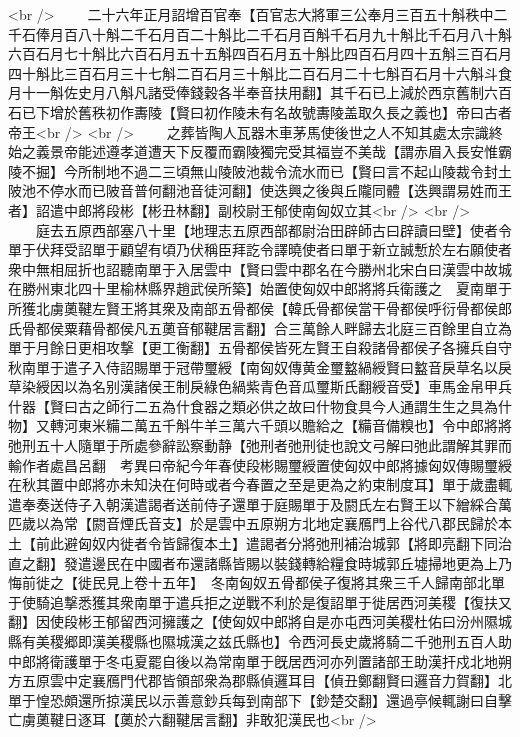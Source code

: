 <br />
　　二十六年正月詔增百官奉【百官志大將軍三公奉月三百五十斛秩中二千石俸月百八十斛二千石月百二十斛比二千石月百斛千石月九十斛比千石月八十斛六百石月七十斛比六百石月五十五斛四百石月五十斛比四百石月四十五斛三百石月四十斛比三百石月三十七斛二百石月三十斛比二百石月二十七斛百石月十六斛斗食月十一斛佐史月八斛凡諸受俸錢穀各半奉音扶用翻】其千石已上減於西京舊制六百石已下增於舊秩初作夀陵【賢曰初作陵未有名故號夀陵盖取久長之義也】帝曰古者帝王<br />
<br />
　　之葬皆陶人瓦器木車茅馬使後世之人不知其處太宗識終始之義景帝能述遵孝道遭天下反覆而霸陵獨完受其福豈不美哉【謂赤眉入長安惟霸陵不掘】今所制地不過二三頃無山陵陂池裁令流水而已【賢曰言不起山陵裁令封土陂池不停水而已陂音普何翻池音徒河翻】使迭興之後與丘隴同體【迭興謂易姓而王者】詔遣中郎將段彬【彬丑林翻】副校尉王郁使南匈奴立其<br />
<br />
　　庭去五原西部塞八十里【地理志五原西部都尉治田辟師古曰辟讀曰壁】使者令單于伏拜受詔單于顧望有頃乃伏稱臣拜訖令譯曉使者曰單于新立誠慙於左右願使者衆中無相屈折也詔聽南單于入居雲中【賢曰雲中郡名在今勝州北宋白曰漢雲中故城在勝州東北四十里榆林縣界趙武侯所築】始置使匈奴中郎將將兵衛護之　夏南單于所獲北虜薁鞬左賢王將其衆及南部五骨都侯【韓氏骨都侯當干骨都侯呼衍骨都侯郎氏骨都侯粟藉骨都侯凡五薁音郁鞬居言翻】合三萬餘人畔歸去北庭三百餘里自立為單于月餘日更相攻撃【更工衡翻】五骨都侯皆死左賢王自殺諸骨都侯子各擁兵自守　秋南單于遣子入侍詔賜單于冠帶璽綬【南匈奴傳黄金璽盭緺綬賢曰盭音戾草名以戾草染綬因以為名别漢諸侯王制戾綠色緺紫青色音瓜璽斯氏翻綬音受】車馬金帛甲兵什器【賢曰古之師行二五為什食器之類必供之故曰什物食具今人通謂生生之具為什物】又轉河東米糒二萬五千斛牛羊三萬六千頭以贍給之【糒音備糗也】令中郎將將弛刑五十人隨單于所處參辭訟察動静【弛刑者弛刑徒也說文弓解曰弛此謂解其罪而輸作者處昌呂翻　考異曰帝紀今年春使段彬賜璽綬置使匈奴中郎將據匈奴傳賜璽綬在秋其置中郎將亦未知決在何時或者今春置之至是更為之約束制度耳】單于歲盡輒遣奉奏送侍子入朝漢遣謁者送前侍子還單于庭賜單于及閼氏左右賢王以下繒綵合萬匹歲以為常【閼音煙氏音支】於是雲中五原朔方北地定襄鴈門上谷代八郡民歸於本土【前此避匈奴内徙者令皆歸復本土】遣謁者分將弛刑補治城郭【將即亮翻下同治直之翻】發遣邊民在中國者布還諸縣皆賜以裝錢轉給糧食時城郭丘墟掃地更為上乃悔前徙之【徙民見上卷十五年】　冬南匈奴五骨都侯子復將其衆三千人歸南部北單于使騎追撃悉獲其衆南單于遣兵拒之逆戰不利於是復詔單于徙居西河美稷【復扶又翻】因使段彬王郁留西河擁護之【使匈奴中郎將自是亦屯西河美稷杜佑曰汾州隰城縣有美稷郷即漢美稷縣也隰城漢之兹氏縣也】令西河長史歲將騎二千弛刑五百人助中郎將衛護單于冬屯夏罷自後以為常南單于旣居西河亦列置諸部王助漢扞戍北地朔方五原雲中定襄鴈門代郡皆領部衆為郡縣偵邏耳目【偵丑鄭翻賢曰邏音力賀翻】北單于惶恐頗還所掠漢民以示善意鈔兵每到南部下【鈔楚交翻】還過亭候輒謝曰自擊亡虜薁鞬日逐耳【薁於六翻鞬居言翻】非敢犯漢民也<br />
